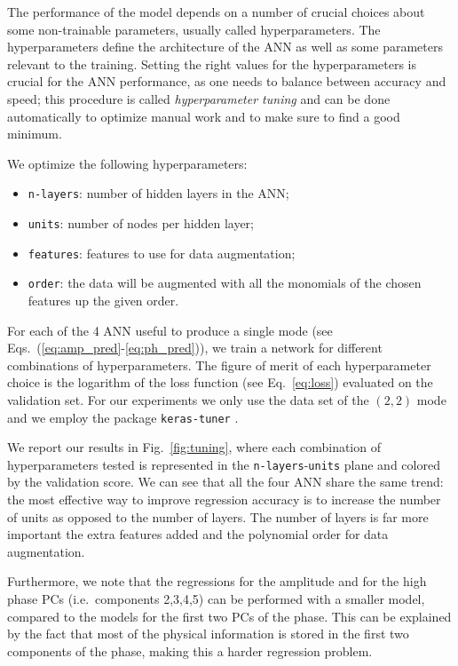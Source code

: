 \documentclass[twocolumn,showpacs,preprintnumbers,nofootinbib,prd,
superscriptaddress,10pt]{revtex4-1}
\begin{document}
The performance of the model depends on a number of crucial choices about some non-trainable parameters, usually called 
hyperparameters. The hyperparameters define the architecture of the ANN as well as some parameters relevant to the training.
Setting the right values for the hyperparameters is crucial for the ANN performance, as one needs to balance 
between accuracy and speed; this procedure is called {\it hyperparameter tuning} and can be done automatically to 
optimize manual work and to make sure to find a good minimum.

We optimize the following hyperparameters:
\begin{itemize}
	\item \texttt{n-layers}: number of hidden layers in the ANN;
	\item \texttt{units}: number of nodes per hidden layer;
	\item \texttt{features}: features to use for data augmentation;
	\item \texttt{order}: the data will be augmented with all the monomials of the chosen features up the given order.
\end{itemize}

For each of the 4 ANN useful to produce a single mode (see Eqs.~(\ref{eq:amp_pred}-\ref{eq:ph_pred})), we train a network for different combinations of hyperparameters. The figure of merit of each 
hyperparameter choice is the logarithm of the loss function (see Eq.~\eqref{eq:loss}) evaluated on the validation set.
For our experiments we only use the data set of the $(2,2)$ mode and we employ the package \texttt{keras-tuner} \cite{omalley2019kerastuner}.

We report our results in Fig.~\ref{fig:tuning}, where each combination of hyperparameters tested is represented in the \texttt{n-layers}-\texttt{units} plane and colored by the validation score. 
We can see that all the four ANN share the same trend: the most effective way to improve regression accuracy is to increase the number of units as opposed to the number of layers.
The number of layers is far more important the extra features added and the polynomial order for data augmentation.

Furthermore, we note that the regressions for the amplitude and for the high phase PCs 
(i.e.~components 2,3,4,5) can be performed with a smaller model, compared to the models for the first two PCs of the phase. 
This can be explained by the fact that most of the physical information is stored in the first two components of the phase, making this a harder regression problem.
\end{document}
